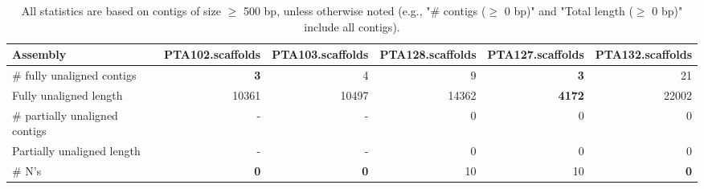 \documentclass[12pt,a4paper]{article}
\begin{document}
\begin{table}[ht]
\begin{center}
\caption{All statistics are based on contigs of size $\geq$ 500 bp, unless otherwise noted (e.g., "\# contigs ($\geq$ 0 bp)" and "Total length ($\geq$ 0 bp)" include all contigs).}
\begin{tabular}{|l*{5}{|r}|}
\hline
Assembly & PTA102.scaffolds & PTA103.scaffolds & PTA128.scaffolds & PTA127.scaffolds & PTA132.scaffolds \\ \hline
\# fully unaligned contigs & {\bf 3} & 4 & 9 & {\bf 3} & 21 \\ \hline
Fully unaligned length & 10361 & 10497 & 14362 & {\bf 4172} & 22002 \\ \hline
\# partially unaligned contigs & - & - & 0 & 0 & 0 \\ \hline
Partially unaligned length & - & - & 0 & 0 & 0 \\ \hline
\# N's & {\bf 0} & {\bf 0} & 10 & 10 & {\bf 0} \\ \hline
\end{tabular}
\end{center}
\end{table}
\end{document}
